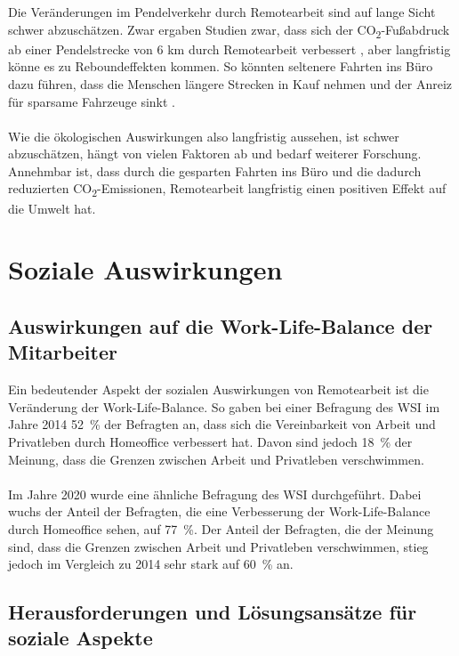 \documentclass[runningheads]{llncs}
\begin{document}
Die Veränderungen im Pendelverkehr durch Remotearbeit sind auf lange Sicht schwer abzuschätzen.
Zwar ergaben Studien zwar, dass sich der CO\textsubscript{2}-Fußabdruck ab einer Pendelstrecke von 6 km durch Remotearbeit verbessert \cite{daniel_crow_working_2022}, aber langfristig könne es zu Reboundeffekten kommen.
So könnten seltenere Fahrten ins Büro dazu führen, dass die Menschen längere Strecken in Kauf nehmen und der Anreiz für sparsame Fahrzeuge sinkt \cite{waldemar_marz_reduziert_2022}.\\\\
Wie die ökologischen Auswirkungen also langfristig aussehen, ist schwer abzuschätzen, hängt von vielen Faktoren ab und bedarf weiterer Forschung.
Annehmbar ist, dass durch die gesparten Fahrten ins Büro und die dadurch reduzierten CO\textsubscript{2}-Emissionen, Remotearbeit langfristig einen positiven Effekt auf die Umwelt hat.

\section{Soziale Auswirkungen}

\subsection{Auswirkungen auf die Work-Life-Balance der Mitarbeiter}

Ein bedeutender Aspekt der sozialen Auswirkungen von Remotearbeit ist die Ver\-änder\-ung der Work-Life-Bal\-an\-ce.
So gaben bei einer Befragung des WSI im Jahre 2014 52~\% der Befragten an, dass sich die Vereinbarkeit von Arbeit und Privatleben durch Homeoffice verbessert hat.
Davon sind jedoch 18~\% der Meinung, dass die Grenzen zwischen Arbeit und Privatleben verschwimmen. \cite{wsi_wsi_2014}
\\\\
Im Jahre 2020 wurde eine ähnliche Befragung des WSI durchgeführt. Dabei wuchs der Anteil der Befragten, die eine Verbesserung der Work-Life-Balance durch Homeoffice sehen, auf 77~\%. Der Anteil der Befragten, die der Meinung sind, dass die Grenzen zwischen Arbeit und Privatleben verschwimmen, stieg jedoch im Vergleich zu 2014 sehr stark auf 60~\% an. \cite{wsi_homeoffice_2020}


\subsection{Herausforderungen und Lösungsansätze für soziale Aspekte}
\end{document}
